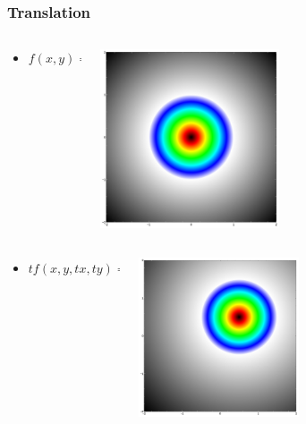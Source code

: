 \documentclass{beamer}
\begin{document}
\begin{frame}
\frametitle{Translation}
\begin{columns}
  \begin{column}{0.5\textwidth}
    \begin{itemize}
    \item $f(x,y)=sqrt(x^2+y^2)-1$
    \end{itemize}
  \end{column}
  \begin{column}{0.5\textwidth}
    \includegraphics[width=0.5\textwidth, right]{implicit_circle.jpg}
  \end{column}
\end{columns}
\begin{columns}
  \begin{column}{0.5\textwidth}
    \begin{itemize}
    \item $tf(x,y,tx,ty)=sqrt((x-tx)^2+(y-ty)^2)-1$
    \end{itemize}
  \end{column}
  \begin{column}{0.5\textwidth}
    \includegraphics[width=0.5\textwidth, right]{implicit_translated_circle.jpg}
  \end{column}
\end{columns}
\end{frame}
\end{document}
